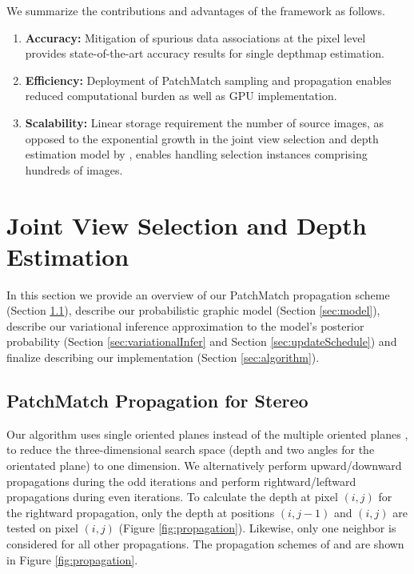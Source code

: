 We summarize the contributions and advantages of the framework as follows.
\begin{enumerate}
\item
{\bf Accuracy:} Mitigation of spurious data associations at the pixel level provides state-of-the-art accuracy results for single depthmap estimation.
\item
{\bf Efficiency:} Deployment of PatchMatch sampling and propagation enables reduced computational burden as well as GPU implementation.
\item
{\bf Scalability:} Linear storage requirement \wrt the number of source images, as opposed to the exponential growth in the joint view selection and depth estimation model by \citet{CombinedDepthOutlier}, enables handling selection instances comprising hundreds of images.
\end{enumerate}

\section{Joint View Selection and Depth Estimation} \label{sec:view_selection_stereo}
In this section we provide an overview of our PatchMatch propagation scheme (Section \ref{sec:PatchMatch}), describe our probabilistic graphic model (Section \ref{sec:model}), describe our variational inference approximation to the model's  posterior probability  (Section \ref{sec:variationalInfer} and Section \ref{sec:updateSchedule}) and finalize describing our implementation  (Section \ref{sec:algorithm}).

\subsection{PatchMatch Propagation for Stereo} \label{sec:PatchMatch}

Our algorithm uses single oriented planes instead of the multiple oriented planes \cite{patchMatchParallel},
to reduce the three-dimensional search space (depth and two angles for the orientated plane) to one dimension. We alternatively perform upward/downward propagations during the odd iterations and  perform rightward/leftward propagations during even iterations. To calculate the depth at pixel $(i,j)$ for the rightward propagation, only the depth at positions $(i,j-1)$ and $(i,j)$ are tested on pixel $(i,j)$ (Figure \ref{fig:propagation}). Likewise, only one neighbor is considered for all other propagations. The propagation schemes of \cite{patchMatchStereo1} and \cite{patchMatchParallel} are shown in Figure  \ref{fig:propagation}.

